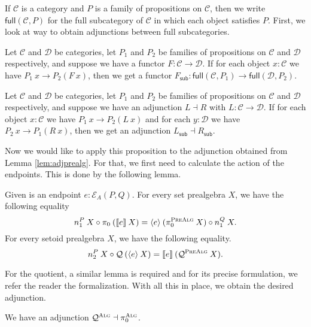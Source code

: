 \documentclass[9pt]{entcs}
\newcommand{\category}[1]{\textsc{#1}}
\newcommand{\function}[1]{\mathsf{#1}}
\newcommand{\0}{\textbf{0}} %
\newcommand{\compm}[2]{#2 \circ #1} %
\newcommand{\functor}[2]{#1 \longrightarrow #2} %
\newcommand{\adj}[2]{#1 \dashv #2} %
\newcommand{\fullsub}[2]{\function{full}(#1,#2)} %
\newcommand{\factorsub}[1]{#1_{\function{sub}}} %
\newcommand{\ep}[3]{\mathcal{E}_{#1}(#2,#3)} %
\newcommand{\semE}[1]{\llbracket #1 \rrbracket} %
\newcommand{\semET}[1]{\langle #1 \rangle} %
\newcommand{\quotF}{\mathcal{Q}}
\newcommand{\pathF}{\pi_0}
\newcommand{\quotPA}{\mathcal{Q}^{\category{PreAlg}}}
\newcommand{\pathPA}{\pi^{\category{PreAlg}}_0}
\newcommand{\quotAA}{\mathcal{Q}^{\category{Alg}}}
\newcommand{\pathAA}{\pi_0^{\category{Alg}}}
\begin{document}
If $\mathcal{C}$ is a category and $P$ is a family of propositions on $\mathcal{C}$, then we write $\fullsub{\mathcal{C}}{P}$ for the full subcategory of $\mathcal{C}$ in which each object satisfies $P$.
First, we look at way to obtain adjunctions between full subcategories.

\begin{lemma}
Let $\mathcal{C}$ and $\mathcal{D}$ be categories, let $P_1$ and $P_2$ be families of propositions on $\mathcal{C}$ and $\mathcal{D}$ respectively, and suppose we have a functor $F : \functor{\mathcal{C}}{\mathcal{D}}$.
If for each object $x : \mathcal{C}$ we have $P_1 \> x \rightarrow P_2(F \> x)$, then we get a functor $\factorsub{F} : \functor{\fullsub{\mathcal{C}}{P_1}}{\fullsub{\mathcal{D}}{P_2}}$.
\end{lemma}

\begin{proposition}
Let $\mathcal{C}$ and $\mathcal{D}$ be categories, let $P_1$ and $P_2$ be families of propositions on $\mathcal{C}$ and $\mathcal{D}$ respectively, and suppose we have an adjunction $\adj{L}{R}$ with $L : \functor{\mathcal{C}}{\mathcal{D}}$.
If for each object $x : \mathcal{C}$ we have $P_1 \> x \rightarrow P_2(L \> x)$ and for each $y : \mathcal{D}$ we have $P_2 \> x \rightarrow P_1(R \> x)$, then we get an adjunction $\adj{\factorsub{L}}{\factorsub{R}}$.
\end{proposition}

Now we would like to apply this proposition to the adjunction obtained from Lemma \ref{lem:adjprealg}.
For that, we first need to calculate the action of the endpoints.
This is done by the following lemma.

\begin{lemma}
Given is an endpoint $e : \ep{A}{P}{Q}$.
For every set prealgebra $X$, we have the following equality
\[
\compm{\pathF \> (\semE{e} \> X)}{n_1^P \> X} = \compm{n_1^Q \> X}{\semET{e} \> (\pathPA \> X)}.
\]
For every setoid prealgebra $X$, we have the following equality.
\[
\compm{\quotF \> (\semET{e} \> X)}{n_2^P \> X} = \semE{e} \> (\quotPA \> X).
\]
\end{lemma}

For the quotient, a similar lemma is required and for its precise formulation, we refer the reader the formalization.
With all this in place, we obtain the desired adjunction.

\begin{theorem}
\label{thm:algadj}
We have an adjunction $\adj{\quotAA}{\pathAA}$.
\end{theorem}
\end{document}
